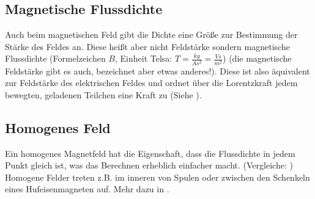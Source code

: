\subsection{Magnetische Flussdichte}

Auch beim magnetischen Feld gibt die Dichte eine Größe zur Bestimmung der Stärke des Feldes an. Diese heißt aber nicht Feldstärke sondern \glqq magnetische Flussdichte \grqq{} (Formelzeichen $B$, Einheit \glqq Telsa\grqq : $T=\frac{kg}{As^2}=\frac{Vs}{m^2}$) (die magnetische Feldstärke gibt es auch, bezeichnet aber etwas anderes!). Diese ist also äquivalent zur Feldstärke des elektrischen Feldes und ordnet über die Lorentzkraft jedem bewegten, geladenen Teilchen eine Kraft zu (Siehe ).


\subsection{Homogenes Feld}

Ein homogenes Magnetfeld hat die Eigenschaft, dass die Flussdichte in jedem Punkt gleich ist, was das Berechnen erheblich einfacher macht. (Vergleiche: ) Homogene Felder treten z.B. im inneren von Spulen oder zwischen den Schenkeln eines Hufeisenmagneten auf. Mehr dazu in .

















